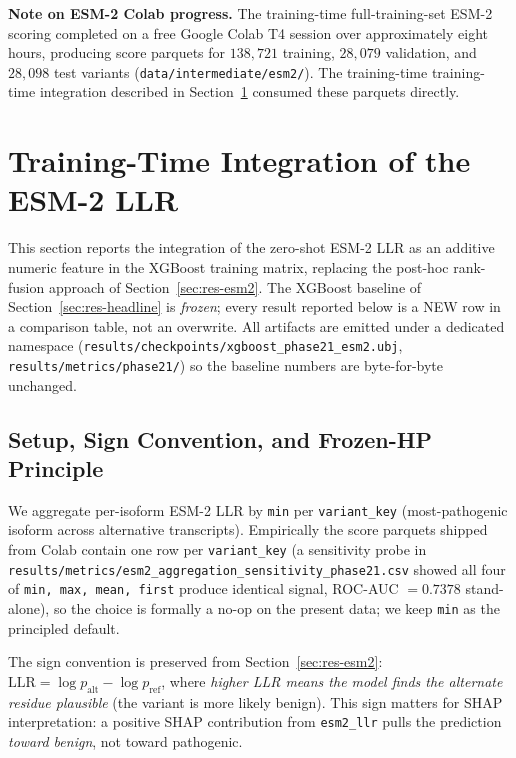\documentclass[11pt,a4paper,oneside]{report}
\begin{document}
\textbf{Note on ESM-2 Colab progress.} The training-time
full-training-set ESM-2 scoring completed on a free Google
Colab T4 session over approximately eight hours, producing
score parquets for $138{,}721$ training, $28{,}079$
validation, and $28{,}098$ test variants
(\texttt{data/intermediate/esm2/}). The training-time
training-time integration described in Section~\ref{sec:res-phase21}
consumed these parquets directly.

\section{Training-Time Integration of the ESM-2 LLR}
\label{sec:res-phase21}

This section reports the integration of the zero-shot ESM-2 LLR
as an additive numeric feature in the XGBoost training matrix,
replacing the post-hoc rank-fusion approach of
Section~\ref{sec:res-esm2}. The XGBoost baseline of
Section~\ref{sec:res-headline} is \emph{frozen}; every result
reported below is a NEW row in a comparison table, not an
overwrite. All artifacts are emitted under a dedicated namespace
(\texttt{results/checkpoints/xgboost\_phase21\_esm2.ubj},
\texttt{results/metrics/phase21/}) so the baseline numbers are
byte-for-byte unchanged.

\subsection{Setup, Sign Convention, and Frozen-HP Principle}
\label{sec:phase21-setup}

We aggregate per-isoform ESM-2 LLR by \texttt{min} per
\texttt{variant\_key} (most-pathogenic isoform across alternative
transcripts). Empirically the score parquets shipped from Colab
contain one row per \texttt{variant\_key} (a sensitivity probe in
\texttt{results/metrics/esm2\_aggregation\_sensitivity\_phase21.csv}
showed all four of \texttt{min, max, mean, first} produce
identical signal, ROC-AUC $=0.7378$ stand-alone), so the choice is
formally a no-op on the present data; we keep \texttt{min} as the
principled default.

The sign convention is preserved from Section~\ref{sec:res-esm2}:
$\text{LLR} = \log p_{\text{alt}} - \log p_{\text{ref}}$, where
\emph{higher LLR means the model finds the alternate residue
plausible} (the variant is more likely benign). This sign matters
for SHAP interpretation: a positive SHAP contribution from
\texttt{esm2\_llr} pulls the prediction \emph{toward benign}, not
toward pathogenic.
\end{document}
